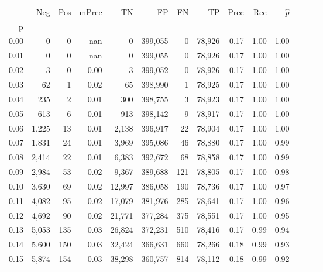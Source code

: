 \begin{tabular}{rrrrrrrrrrrrrr}
\toprule
{} &    Neg &    Pos & mPrec &       TN &       FP &      FN &      TP &  Prec &   Rec & $\hat{p}$ \\
p    &        &        &       &          &          &         &         &       &       &           \\
\midrule
0.00 &      0 &      0 &   nan &        0 &  399,055 &       0 &  78,926 &  0.17 &  1.00 &      1.00 \\
0.01 &      0 &      0 &   nan &        0 &  399,055 &       0 &  78,926 &  0.17 &  1.00 &      1.00 \\
0.02 &      3 &      0 &  0.00 &        3 &  399,052 &       0 &  78,926 &  0.17 &  1.00 &      1.00 \\
0.03 &     62 &      1 &  0.02 &       65 &  398,990 &       1 &  78,925 &  0.17 &  1.00 &      1.00 \\
0.04 &    235 &      2 &  0.01 &      300 &  398,755 &       3 &  78,923 &  0.17 &  1.00 &      1.00 \\
0.05 &    613 &      6 &  0.01 &      913 &  398,142 &       9 &  78,917 &  0.17 &  1.00 &      1.00 \\
0.06 &  1,225 &     13 &  0.01 &    2,138 &  396,917 &      22 &  78,904 &  0.17 &  1.00 &      1.00 \\
0.07 &  1,831 &     24 &  0.01 &    3,969 &  395,086 &      46 &  78,880 &  0.17 &  1.00 &      0.99 \\
0.08 &  2,414 &     22 &  0.01 &    6,383 &  392,672 &      68 &  78,858 &  0.17 &  1.00 &      0.99 \\
0.09 &  2,984 &     53 &  0.02 &    9,367 &  389,688 &     121 &  78,805 &  0.17 &  1.00 &      0.98 \\
0.10 &  3,630 &     69 &  0.02 &   12,997 &  386,058 &     190 &  78,736 &  0.17 &  1.00 &      0.97 \\
0.11 &  4,082 &     95 &  0.02 &   17,079 &  381,976 &     285 &  78,641 &  0.17 &  1.00 &      0.96 \\
0.12 &  4,692 &     90 &  0.02 &   21,771 &  377,284 &     375 &  78,551 &  0.17 &  1.00 &      0.95 \\
0.13 &  5,053 &    135 &  0.03 &   26,824 &  372,231 &     510 &  78,416 &  0.17 &  0.99 &      0.94 \\
0.14 &  5,600 &    150 &  0.03 &   32,424 &  366,631 &     660 &  78,266 &  0.18 &  0.99 &      0.93 \\
0.15 &  5,874 &    154 &  0.03 &   38,298 &  360,757 &     814 &  78,112 &  0.18 &  0.99 &      0.92 \\

\end{tabular}
